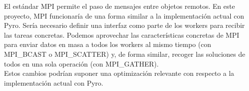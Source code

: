 El estándar MPI permite el paso de mensajes entre objetos remotos. En este proyecto, MPI funcionaría de una forma similar a la implementación actual con Pyro. Sería necesario definir una interfaz como parte de los workers para recibir las tareas concretas. Podemos aprovechar las características concretas de MPI para enviar datos en masa a todos los workers al mismo tiempo (con MPI\_BCAST o MPI\_SCATTER) y, de forma similar, recoger las soluciones de todos en una sola operación (con MPI\_GATHER).\\

Estos cambios podrían suponer una optimización relevante con respecto a la implementación actual con Pyro.